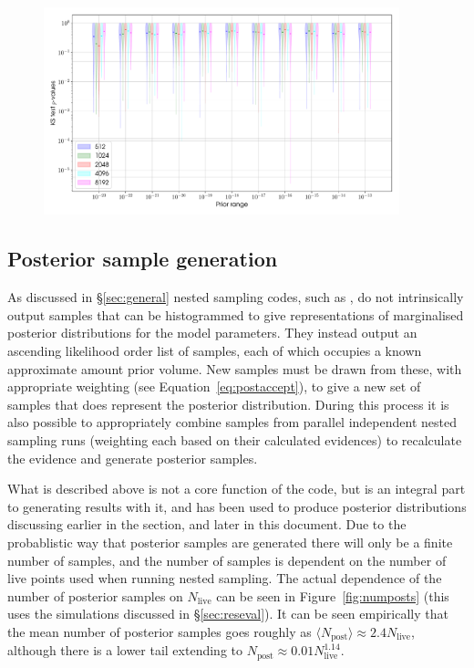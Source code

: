 \begin{figure}[phtb]
\begin{center}
\includegraphics[width=0.92\textwidth]{./figures/proptesting/walk_uniform_prop/kstest/collate_plots_wup_ks}
\caption{ \protect}
\end{center}
\end{figure}

\subsection{Posterior sample generation}\label{sec:postsamps}

As discussed in \S\ref{sec:general} nested sampling codes, such as \lppen, do not intrinsically output samples that can be histogrammed to give
representations of marginalised posterior distributions for the model parameters. They instead output an ascending likelihood order list of samples,
each of which occupies a known approximate amount prior volume. New samples must be drawn from these, with appropriate weighting (see Equation~\ref{eq:postaccept}),
to give a new set of samples that does represent the posterior distribution. During this process it is also possible to appropriately combine samples from parallel
independent nested sampling runs (weighting each based on their calculated evidences) to recalculate the evidence and generate posterior samples.

What is described above is not a core function of the \lppen code, but is an integral part to generating results with it, and has been used to
produce posterior distributions discussing earlier in the section, and later in this document. Due to the probablistic
way that posterior samples are generated there will only be a finite number of samples, and the number of samples is dependent on the number
of live points used when running nested sampling. The actual dependence of the number of posterior samples on $N_{\text{live}}$ can be seen in
Figure~\ref{fig:numposts} (this uses the simulations discussed in \S\ref{sec:reseval}). It can be seen empirically that the mean number of posterior
samples goes roughly as $\langle N_{\text{post}} \rangle \approx 2.4N_{\text{live}}$, although there is a lower tail extending to $N_{\text{post}} \approx
0.01N_{\text{live}}^{1.14}$.

